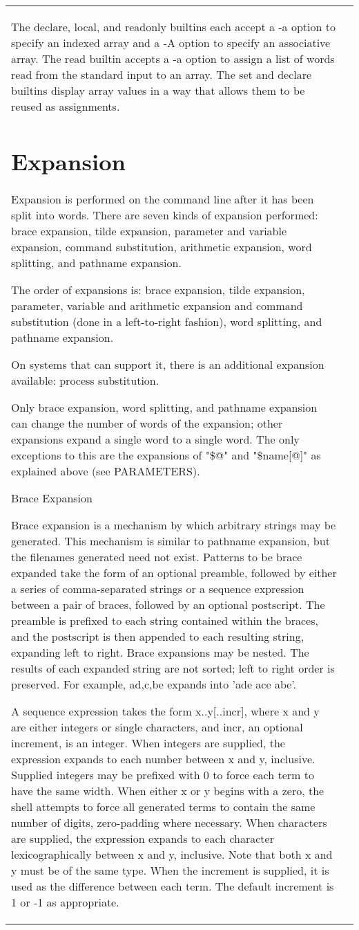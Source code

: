 \documentclass[11pt]{article}
\begin{document}
\begin{longtable}{p{}p{}}
The declare, local, and readonly builtins each accept a -a option to specify an indexed array and a -A option to specify an associative array. The read builtin accepts a -a option to assign a list of words read from the standard input to an array. The set and declare builtins display array values in a way that allows them to be reused as assignments.

\section{Expansion}\label{sec:expansion}
Expansion is performed on the command line after it has been split into words. There are seven kinds of expansion performed: brace expansion, tilde expansion, parameter and variable expansion, command substitution, arithmetic expansion, word splitting, and pathname expansion.

The order of expansions is: brace expansion, tilde expansion, parameter, variable and arithmetic expansion and command substitution (done in a left-to-right fashion), word splitting, and pathname expansion.

On systems that can support it, there is an additional expansion available: process substitution.

Only brace expansion, word splitting, and pathname expansion can change the number of words of the expansion; other expansions expand a single word to a single word. The only exceptions to this are the expansions of "\$@" and "\${name[@]}" as explained above (see PARAMETERS).

Brace Expansion

Brace expansion is a mechanism by which arbitrary strings may be generated. This mechanism is similar to pathname expansion, but the filenames generated need not exist. Patterns to be brace expanded take the form of an optional preamble, followed by either a series of comma-separated strings or a sequence expression between a pair of braces, followed by an optional postscript. The preamble is prefixed to each string contained within the braces, and the postscript is then appended to each resulting string, expanding left to right.
Brace expansions may be nested. The results of each expanded string are not sorted; left to right order is preserved. For example, a{d,c,b}e expands into 'ade ace abe'.

A sequence expression takes the form {x..y[..incr]}, where x and y are either integers or single characters, and incr, an optional increment, is an integer. When integers are supplied, the expression expands to each number between x and y, inclusive. Supplied integers may be prefixed with 0 to force each term to have the same width. When either x or y begins with a zero, the shell attempts to force all generated terms to contain the same number of digits, zero-padding where necessary. When characters are supplied, the expression expands to each character lexicographically between x and y, inclusive. Note that both x and y must be of the same type. When the increment is supplied, it is used as the difference between each term. The default increment is 1 or -1 as appropriate.


\end{longtable}
\end{document}
